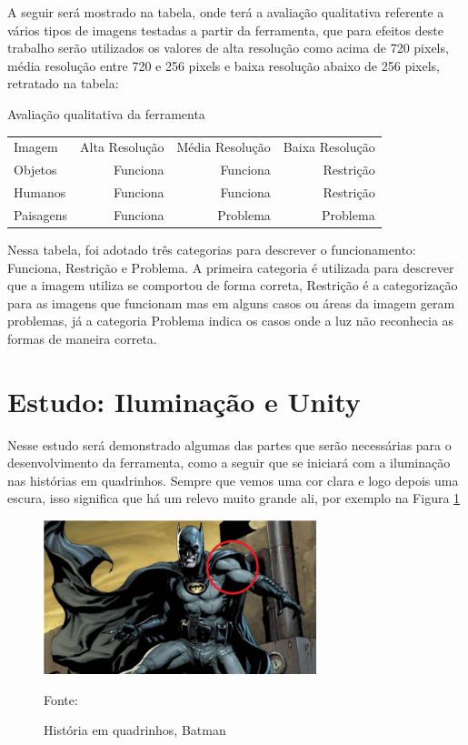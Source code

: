 A seguir será mostrado na tabela, onde terá a avaliação qualitativa referente a vários tipos de imagens testadas a partir da ferramenta, que para efeitos deste trabalho serão utilizados os valores de alta resolução como acima de 720 pixels, média resolução entre 720 e 256 pixels e baixa resolução abaixo de 256 pixels, retratado na tabela:

Avaliação qualitativa da ferramenta

\begin{tabular}{l r r r}
Imagem & Alta Resolução & Média Resolução & Baixa Resolução\\
Objetos & Funciona  & Funciona  & Restrição\\
Humanos & Funciona  & Funciona  & Restrição\\
Paisagens & Funciona & Problema &  Problema\\
\end{tabular}

Nessa tabela, foi adotado três categorias para descrever o funcionamento: Funciona, Restrição e Problema.
A primeira categoria é utilizada para descrever que a imagem utiliza se comportou de forma correta, Restrição é a categorização para as imagens que funcionam mas em alguns casos ou áreas da imagem geram problemas, já a categoria Problema indica os casos onde a luz não reconhecia as formas de maneira correta.

\section{Estudo: Iluminação e Unity}
Nesse estudo será demonstrado algumas das partes que serão necessárias para o desenvolvimento da ferramenta, como a seguir que se iniciará com a iluminação nas histórias em quadrinhos.
Sempre que vemos uma cor clara e logo depois uma escura, isso significa que há um relevo muito grande ali, por exemplo  na Figura \ref{fig:batman}

\begin{figure}[ht]
\caption{História em quadrinhos, Batman}
\centering
\includegraphics{imagens/batman.png}

Fonte: \cite{Bazela2022-yg}
\label{fig:batman}
\end{figure}    


